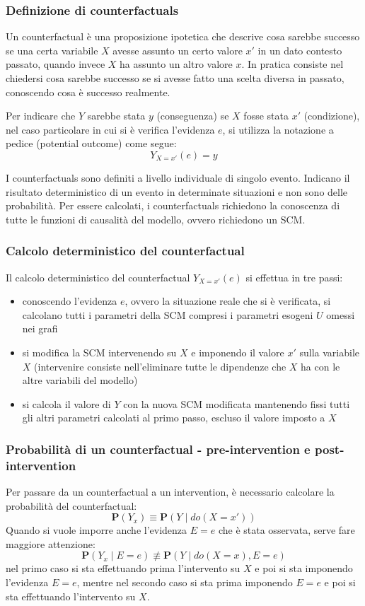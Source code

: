 \subsubsection*{Definizione di counterfactuals}
Un counterfactual è una proposizione ipotetica che descrive cosa sarebbe successo se una certa variabile \(X\) avesse assunto
un certo valore \(x'\) in un dato contesto passato, quando invece \(X\) ha assunto un altro valore \(x\). In pratica consiste
nel chiedersi cosa sarebbe successo se si avesse fatto una scelta diversa in passato, conoscendo cosa è successo realmente.

Per indicare che \(Y\) sarebbe stata \(y\) (conseguenza) se \(X\) fosse stata \(x'\) (condizione), nel caso particolare in
cui si è verifica l'evidenza \(e\), si utilizza la notazione a pedice (potential outcome) come segue:
\[Y_{X = x'}(e) = y\]

I counterfactuals sono definiti a livello individuale di singolo evento. Indicano il risultato deterministico di un evento
in determinate situazioni e non sono delle probabilità. Per essere calcolati, i counterfactuals richiedono la conoscenza
di tutte le funzioni di causalità del modello, ovvero richiedono un SCM.

\subsubsection*{Calcolo deterministico del counterfactual}
Il calcolo deterministico del counterfactual \(Y_{X = x'}(e)\) si effettua in tre passi:
\begin{itemize}
	\item conoscendo l'evidenza \(e\), ovvero la situazione reale che si è verificata, si calcolano tutti i parametri della SCM
	compresi i parametri esogeni \(U\) omessi nei grafi
	\item si modifica la SCM intervenendo su \(X\) e imponendo il valore \(x'\) sulla variabile \(X\) (intervenire consiste
	nell'eliminare tutte le dipendenze che \(X\) ha con le altre variabili del modello)
	\item si calcola il valore di \(Y\) con la nuova SCM modificata mantenendo fissi tutti gli altri parametri calcolati
	al primo passo, escluso il valore imposto a \(X\) 
\end{itemize}

\subsubsection*{Probabilità di un counterfactual - pre-intervention e post-intervention}
Per passare da un counterfactual a un intervention, è necessario calcolare la probabilità del counterfactual:
\[\textbf{P}(Y_x) \equiv \textbf{P}(Y \mid do(X = x'))\]
Quando si vuole imporre anche l'evidenza \(E = e\) che è stata osservata, serve fare maggiore attenzione:
\[\textbf{P}(Y_{x} \mid E = e) \not\equiv \textbf{P}(Y \mid do(X = x), E = e)\]
nel primo caso si sta effettuando prima l'intervento su \(X\) e poi si sta imponendo l'evidenza \(E = e\), mentre nel secondo
caso si sta prima imponendo \(E = e\) e poi si sta effettuando l'intervento su \(X\). 

